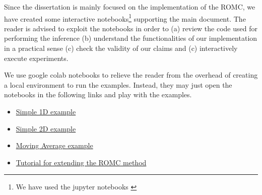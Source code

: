 Since the dissertation is mainly focused on the implementation of the
ROMC, we have created some interactive notebooks\footnote{We have used
  the jupyter notebooks \autocite{Kluyver:2016aa}} supporting the main
document. The reader is advised to exploit the notebooks in order to
(a) review the code used for performing the inference (b) understand
the functionalities of our implementation in a practical sense (c)
check the validity of our claims and (c) interactively execute
experiments.

We use google colab notebooks \autocite{Bisong2019} to relieve the reader from the overhead
of creating a local environment to run the examples. Instead, they may just open the notebooks in the following links and play with the examples.

\begin{itemize}
\item \href{https://colab.research.google.com/drive/1lGRp0XrNfZ64NN0ASB_tYEKowXwlveDC}{Simple 1D example}
\item \href{https://colab.research.google.com/drive/1Fof_WmCi1YizzSI_63aEsbLXsno5gSZ3}{Simple 2D example}
\item \href{https://colab.research.google.com/drive/1nkdACQ370SSc0KB1bHv4sBRaxMlMqoNH}{Moving Average example}
\item \href{https://colab.research.google.com/drive/1RzB-V1QueP1y1nyzv_VOqR1nVz3DUH3v}{Tutorial for extending the ROMC method}
\end{itemize}
